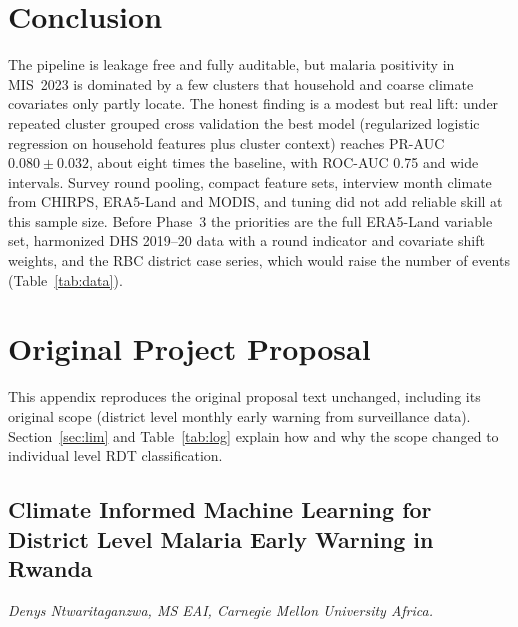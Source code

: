\documentclass[11pt]{article}
\begin{document}
\section{Conclusion}
The pipeline is leakage free and fully auditable, but malaria positivity in MIS~2023 is dominated by a few clusters that household and coarse climate covariates only partly locate. The honest finding is a modest but real lift: under repeated cluster grouped cross validation the best model (regularized logistic regression on household features plus cluster context) reaches PR-AUC $0.080\pm0.032$, about eight times the baseline, with ROC-AUC 0.75 and wide intervals. Survey round pooling, compact feature sets, interview month climate from CHIRPS, ERA5-Land and MODIS, and tuning did not add reliable skill at this sample size. Before Phase~3 the priorities are the full ERA5-Land variable set, harmonized DHS 2019--20 data with a round indicator and covariate shift weights, and the RBC district case series, which would raise the number of events (Table~\ref{tab:data}).

\clearpage
\appendix
\section{Original Project Proposal}
\label{app:proposal}
This appendix reproduces the original proposal text unchanged, including its original scope (district level monthly early warning from surveillance data). Section~\ref{sec:lim} and Table~\ref{tab:log} explain how and why the scope changed to individual level RDT classification.

\subsection*{Climate Informed Machine Learning for District Level Malaria Early Warning in Rwanda}
\textit{Denys Ntwaritaganzwa, MS EAI, Carnegie Mellon University Africa.}
\end{document}
